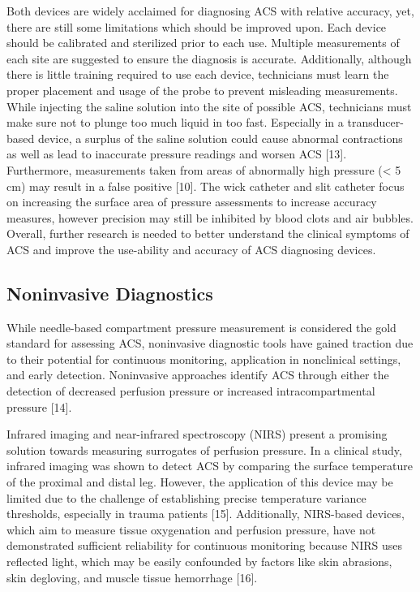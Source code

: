 \documentclass{article}
\begin{document}
Both devices are widely acclaimed for diagnosing ACS with relative accuracy, yet, there are still some limitations which should be improved upon. Each device should be calibrated and sterilized prior to each use. Multiple measurements of each site are suggested to ensure the diagnosis is accurate. Additionally, although there is little training required to use each device, technicians must learn the proper placement and usage of the probe to prevent misleading measurements. While injecting the saline solution into the site of possible ACS, technicians must make sure not to plunge too much liquid in too fast. Especially in a transducer-based device, a surplus of the saline solution could cause abnormal contractions as well as lead to inaccurate pressure readings and worsen ACS [13]. Furthermore, measurements taken from areas of abnormally high pressure  (< 5 cm) may result in a false positive [10]. The wick catheter and slit catheter focus on increasing the surface area of pressure assessments to increase accuracy measures, however precision may still be inhibited by blood clots and air bubbles. Overall, further research is needed to better understand the clinical symptoms of ACS and improve the use-ability and accuracy of ACS diagnosing devices. 

\subsection{Noninvasive Diagnostics}
While needle-based compartment pressure measurement is considered the gold standard for assessing ACS, noninvasive diagnostic tools have gained traction due to their potential for continuous monitoring, application in nonclinical settings, and early detection. Noninvasive approaches identify ACS through either the detection of decreased perfusion pressure or increased intracompartmental pressure [14]. 
   
Infrared imaging and near-infrared spectroscopy (NIRS) present a promising solution towards measuring surrogates of perfusion pressure. In a clinical study, infrared imaging was shown to detect ACS by comparing the surface temperature of the proximal and distal leg. However, the application of this device may be limited due to the challenge of establishing precise temperature variance thresholds, especially in trauma patients [15]. Additionally, NIRS-based devices, which aim to measure tissue oxygenation and perfusion pressure, have not demonstrated sufficient reliability for continuous monitoring because NIRS uses reflected light, which may be easily confounded by factors like skin abrasions, skin degloving, and muscle tissue hemorrhage [16]. 
    
\end{document}
